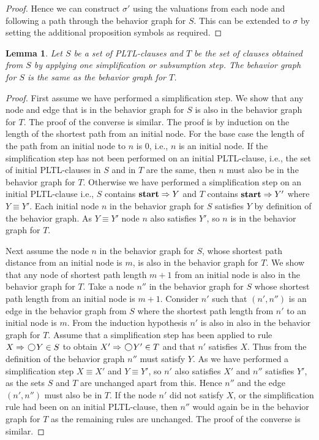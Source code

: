 \documentclass[nohyperref]{acmtrans2f}
\newcommand{\next}{\!\raisebox{-.2ex}{ %
                        \mbox{\unitlength=0.9ex
                        \begin{picture}(2,2)
                        \linethickness{0.06ex}
                        \put(1,1){\circle{2}} %
                        \end{picture}}}       %
                        \,}
\let\imp=\Rightarrow
\def\lstart{\hbox{\rm\bf start}}
\newtheorem{sublemma}{Lemma}[subsection]
\begin{document}
\begin{proof}
Hence we can construct $\sigma'$ using the valuations from each node and
following a path through the behavior graph for $S$. This can be extended
to $\sigma$ by setting the additional proposition symbols as required.
\end{proof}

\begin{sublemma}\label{simp.sump}
Let $S$ be a set of PLTL-clauses and $T$ be the set of clauses obtained
from $S$ by applying one simplification or subsumption step. The behavior
graph for $S$ is the same as the behavior graph for $T$.
\end{sublemma}
\begin{proof}

First assume  we have performed a simplification step.
We show that any node and edge that is in the behavior graph for $S$ is
also in the behavior graph for $T$. The proof of the converse is similar.
The proof is by induction on the
length of the shortest path from an initial node. 
For the base case the length of the path from an initial node to $n$ is 0,
i.e., $n$ is an initial node. If the simplification step has not been
performed on an initial PLTL-clause, i.e., the set of initial PLTL-clauses in
$S$ and in $T$ are the same, then $n$ must also be in the behavior graph for
$T$. Otherwise we have performed a simplification step on an initial PLTL-clause
i.e., $S$ contains $\lstart \imp Y$ and $T$ contains $\lstart \imp Y'$ where
$Y \equiv Y'$. Each initial node $n$ in the behavior graph for $S$ satisfies
$Y$ by definition of the behavior graph. As $Y \equiv Y'$ node $n$ also
satisfies $Y'$, so $n$ is in the behavior graph for $T$.

Next assume the node $n$ in the behavior graph for $S$, whose shortest
 path distance from an initial  node is $m$, is also in the behavior graph
 for $T$. We show that any node of shortest path length $m+1$ from an
 initial node is also in the behavior graph for $T$. Take a node $n''$
 in the behavior graph for $S$ whose shortest path length from an  initial
 node is $m+1$. Consider $n'$ such that $(n',n'')$ is an edge in the
 behavior graph from $S$ where the shortest path length from $n'$ to an
 initial node is $m$. From the induction hypothesis $n'$ is also in also in
 the behavior graph for $T$.
 Assume that a simplification step has been applied to rule $X \imp \next Y
\in S$ to obtain $X' \imp \next Y' \in T$ and that $n'$ satisfies $X$.
Thus from the definition of the behavior graph $n''$ must satisfy $Y$.
 As we have performed a simplification step $X \equiv X'$ and $Y \equiv Y'$,
 so $n'$ also satisfies $X'$ and $n''$ satisfies $Y'$, as the sets $S$ and
 $T$ are unchanged apart from this. Hence $n''$ and the edge $(n',n'')$ must
 also  be in $T$. If the node $n'$ did not satisfy $X$, or the
 simplification rule had been on an initial PLTL-clause, then $n''$ would
 again be in the behavior graph for $T$ as the remaining rules are
 unchanged. The proof of the converse is similar.


\end{proof}
\end{document}
